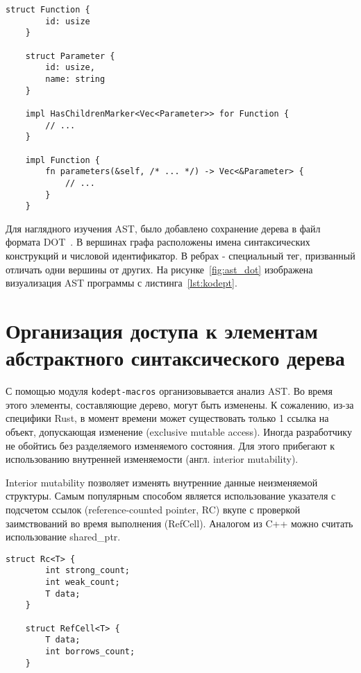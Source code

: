 \begin{lstlisting}[label=lst:node, caption={Упрощенное представление структур после всех доработок на языке Rust}]
    struct Function {
        id: usize
    }

    struct Parameter {
        id: usize,
        name: string
    }

    impl HasChildrenMarker<Vec<Parameter>> for Function {
        // ...
    }

    impl Function {
        fn parameters(&self, /* ... */) -> Vec<&Parameter> {
            // ...
        }
    }
\end{lstlisting}

Для наглядного изучения AST, было добавлено сохранение дерева в файл формата DOT~\cite{Dot}.
В вершинах графа расположены имена синтаксических конструкций и числовой идентификатор.
В ребрах - специальный тег, призванный отличать одни вершины от других.
На рисунке~\ref{fig:ast_dot} изображена визуализация AST программы с листинга~\ref{lst:kodept}.

\section{Организация доступа к элементам абстрактного синтаксического дерева}
\label{sec:ast_access}

С помощью модуля \lstinline{kodept-macros} организовывается анализ AST\@.
Во время этого элементы, составляющие дерево, могут быть изменены.
К сожалению, из-за специфики Rust, в момент времени может существовать только 1 ссылка на объект, допускающая изменение (exclusive mutable access).
Иногда разработчику не обойтись без разделяемого изменяемого состояния.
Для этого прибегают к использованию внутренней изменяемости (англ. interior mutability).

Interior mutability позволяет изменять внутренние данные неизменяемой структуры.
Самым популярным способом является использование указателя с подсчетом ссылок (reference-counted pointer, RC) вкупе с проверкой заимствований во время выполнения (RefCell).
Аналогом из C++ можно считать использование shared\_ptr.

\begin{lstlisting}[label=lst:interior, caption={Упрощенная реализация структур Rc и RefCell на псевдокоде}]
    struct Rc<T> {
        int strong_count;
        int weak_count;
        T data;
    }

    struct RefCell<T> {
        T data;
        int borrows_count;
    }
\end{lstlisting}

